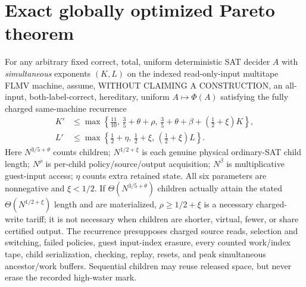 \documentclass[11pt]{article}
\begin{document}
\section{Exact globally optimized Pareto theorem}
For any arbitrary fixed correct, total, uniform deterministic SAT decider $A$ with \emph{simultaneous} exponents $(K,L)$ on the indexed read-only-input multitape FLMV machine, assume, WITHOUT CLAIMING A CONSTRUCTION, an all-input, both-label-correct, hereditary, uniform $A\mapsto\Phi(A)$ satisfying the fully charged same-machine recurrence
\begin{align}
K'&\le\max\left\{\frac{11}{10},\,\frac35+\theta+\rho,\,
                \frac35+\theta+\beta+(\frac12+\xi)K\right\},\\
L'&\le\max\left\{\frac12+\eta,\,\frac12+\xi,\,
                (\frac12+\xi)L\right\}.
\end{align}
Here $N^{3/5+\theta}$ counts children; $N^{1/2+\xi}$ is each genuine physical ordinary-SAT child length; $N^\rho$ is per-child policy/source/output acquisition; $N^\beta$ is multiplicative guest-input access; $\eta$ counts extra retained state. All six parameters are nonnegative and $\xi<1/2$. If $\Theta(N^{3/5+\theta})$ children actually attain the stated $\Theta(N^{1/2+\xi})$ length and are materialized, $\rho\ge1/2+\xi$ is a necessary charged-write tariff; it is not necessary when children are shorter, virtual, fewer, or share certified output. The recurrence presupposes charged source reads, selection and switching, failed policies, guest input-index erasure, every counted work/index tape, child serialization, checking, replay, resets, and peak simultaneous ancestor/work buffers. Sequential children may reuse released space, but never erase the recorded high-water mark.
\end{document}
